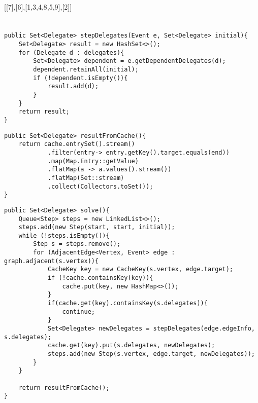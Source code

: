 \documentclass{article}
\begin{document}
\subsection{}

\subsection{}
[[7],[6],[1,3,4,8,5,9],[2]]


\part{}
\section{}
\subsection{}
\begin{verbatim}
public Set<Delegate> stepDelegates(Event e, Set<Delegate> initial){
    Set<Delegate> result = new HashSet<>();
    for (Delegate d : delegates){
        Set<Delegate> dependent = e.getDependentDelegates(d);
        dependent.retainAll(initial);
        if (!dependent.isEmpty()){
            result.add(d);
        }
    }
    return result;
}
\end{verbatim}

\begin{verbatim}
public Set<Delegate> resultFromCache(){
    return cache.entrySet().stream()
            .filter(entry-> entry.getKey().target.equals(end))
            .map(Map.Entry::getValue)
            .flatMap(a -> a.values().stream())
            .flatMap(Set::stream)
            .collect(Collectors.toSet());
}
\end{verbatim}

\begin{verbatim}
public Set<Delegate> solve(){
    Queue<Step> steps = new LinkedList<>();
    steps.add(new Step(start, start, initial));
    while (!steps.isEmpty()){
        Step s = steps.remove();
        for (AdjacentEdge<Vertex, Event> edge : graph.adjacent(s.vertex)){
            CacheKey key = new CacheKey(s.vertex, edge.target);
            if (!cache.containsKey(key)){
                cache.put(key, new HashMap<>());
            }
            if(cache.get(key).containsKey(s.delegates)){
                continue;
            }
            Set<Delegate> newDelegates = stepDelegates(edge.edgeInfo, s.delegates);
            cache.get(key).put(s.delegates, newDelegates);
            steps.add(new Step(s.vertex, edge.target, newDelegates));
        }
    }

    return resultFromCache();
}
\end{verbatim}

\subsection{}
\end{document}
